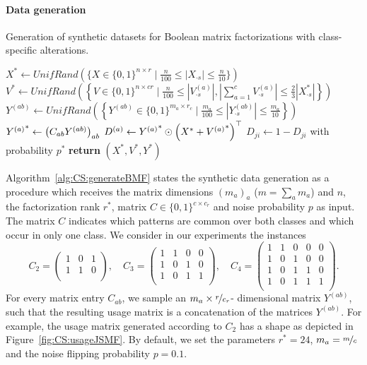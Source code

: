 \paragraph{Data generation}
\begin{algorithm}[t]
\caption{Generation of synthetic datasets for Boolean matrix factorizations with class-specific alterations.}
\begin{algorithmic}[1]
  	\State $X^*\gets UnifRand(\{X\in\{0,1\}^{n\times r}\mid \frac{n}{100}\leq|X_{\cdot s}|\leq \frac{n}{10}\})$
  	\State $\displaystyle V^*\gets UnifRand\left(\left\{V\in\{0,1\}^{n\times cr}\mid \frac{n}{100}\leq\left|V^{(a)}_{\cdot s}\right|, \left|\sum_{a=1}^cV^{(a)}_{\cdot s}\right|\leq \frac{2}{3}|X_{\cdot s}^*|\right\}\right)$
  	    \State ${Y^{(ab)}}\gets UnifRand\left(\left\{{Y^{(ab)}}\in\{0,1\}^{m_a\times r_c}\mid \frac{m_a}{100}\leq|Y^{(ab)}_{\cdot s}|\leq \frac{m_a}{10}\right\}\right)$
  	\EndFor
  	\State ${Y^{(a)}}^*\gets \left(C_{ab}Y^{(ab)}\right)_{ab}$
  	\State $D^{(a)}\gets {Y^{(a)}}^* \odot \left(X^*+{V^{(a)}}^*\right)^\top$ 
  	    \State $D_{ji}\gets 1-D_{ji}$ with probability $p^*$ 
    \EndFor
    \State \textbf{return} $(X^*,V^*,Y^*)$
  \EndFunction
\end{algorithmic}
\label{alg:CS:generateBMF}
\end{algorithm}
Algorithm~\ref{alg:CS:generateBMF} states the synthetic data generation as a procedure which receives the matrix dimensions $(m_a)_a$ ($m=\sum_am_a$) and $n$, the factorization rank $r^*$, matrix $C\in\{0,1\}^{c\times c_r}$ and noise probability $p$ as input. The matrix $C$ indicates which patterns are common over both classes and which occur in only one class. We consider in our experiments the instances
\[C_2=
\begin{pmatrix}
1 & 0 & 1\\
1 & 1 & 0\\
\end{pmatrix},\quad 
C_3=\begin{pmatrix}
1 & 1 & 0 & 0\\
1 & 0 & 1 & 0\\
1& 0 & 1 & 1\\
\end{pmatrix},\quad
C_4=\begin{pmatrix}
1 & 1 & 0 & 0 & 0\\
1 & 0 & 1 & 0 & 0\\
1 & 0 & 1 & 1 & 0\\
1 & 0 & 1 & 1 & 1\\
\end{pmatrix}.\]
For every matrix entry $C_{ab}$, we sample an $m_a\times \nicefrac{r}{c_r}$- dimensional matrix $Y^{(ab)}$, such that the resulting usage matrix is a concatenation of the matrices $Y^{(ab)}$. For example, the usage matrix generated according to $C_2$ has a shape as depicted in Figure~\ref{fig:CS:usageJSMF}.
By default, we set the parameters $r^*=24$, $m_a=\nicefrac{m}{c}$ and the noise flipping probability $p=0.1$.

